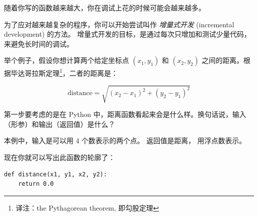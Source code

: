 
随着你写的函数越来越大，你在调试上花的时候可能会越来越多。


为了应对越来越复杂的程序，你可以开始尝试叫作 {\em 增量式开发} (incremental development) 的方法。 增量式开发的目标，是通过每次只增加和测试少量代码，来避免长时间的调试。
  


举个例子，假设你想计算两个给定坐标点 $(x_1, y_1)$ 和 $(x_2, y_2)$ 之间的距离。根据毕达哥拉斯定理\footnote{译注：the Pythagorean theorem, 即勾股定理}，二者的距离是：


\begin{displaymath}
\mathrm{distance} = \sqrt{(x_2 - x_1)^2 + (y_2 - y_1)^2}
\end{displaymath}

%

第一步要考虑的是在 Python 中，距离函数看起来会是什么样。换句话说，输入（形参）和输出（返回值）是什么？


本例中，输入是可以用 4 个数表示的两个点。 返回值是距离， 用浮点数表示。


现在你就可以写出此函数的轮廓了：

\begin{lstlisting}
def distance(x1, y1, x2, y2):
    return 0.0
\end{lstlisting}

%

